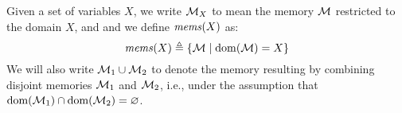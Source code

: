 Given a set of variables $X$, we write $\mathcal{M}_X$ to mean the memory
$\mathcal{M}$ restricted to the domain $X$, and
and we define $\mathit{mems}(X)$ as:
$$
\mathit{mems}(X) \triangleq \{ \mathcal{M} \mid \mathrm{dom}(\mathcal{M}) = X \}
$$
We will also write $\mathcal{M}_1 \cup \mathcal{M}_2$ to denote
the memory resulting by combining disjoint
memories $\mathcal{M}_1$ and $\mathcal{M}_2$, i.e.,
under the assumption that $\mathrm{dom}(\mathcal{M}_1) \cap \mathrm{dom}(\mathcal{M}_2) = \varnothing$.

